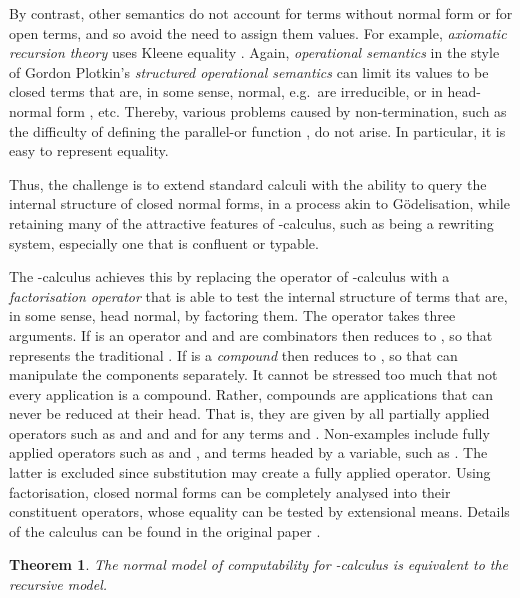 \documentclass[a4paper]{article}
\newtheorem{theorem}{Theorem}
\begin{document}
By contrast, other semantics do not account for terms without normal
form or for open terms, and so avoid the need to assign them values.
For example, {\em axiomatic recursion theory} \cite{Rogers67, Jones97}
uses Kleene equality \cite[page 327]{Kleene52}.  Again, {\em operational semantics} in the style
of Gordon Plotkin's {\em structured operational semantics}
\cite{Plotkin04} can limit its values to be closed terms that are, in
some sense, normal, e.g.\ are irreducible, or in head-normal form
\cite{Bare84a}, etc. Thereby, various problems caused by non-termination,
such as the difficulty of defining the parallel-or function
\cite{Abramsky00}, do not arise. In particular, it is easy to
represent equality.


Thus, the challenge is to extend standard calculi with the ability to
query the internal structure of closed normal forms, in a process akin
to G\"odelisation, while retaining many of the attractive features of
-calculus, such as being a rewriting system, especially one that
is confluent or typable.



The -calculus achieves this by replacing the operator  of
-calculus with a {\em factorisation operator}  that is able to
test the internal structure of terms that are, in some sense, head
normal, by factoring them.  The operator  takes three arguments. If
 is an operator and  and  are combinators then  reduces
to , so that  represents the traditional . If  is a {\em
  compound} then  reduces to , so that  can
manipulate the components separately. It cannot be stressed too much
that not every application is a compound.  Rather, compounds are
applications that can never be reduced at their head.  That is, they
are given by all partially applied operators such as  and 
and  and  for any terms  and .  Non-examples include
fully applied operators such as  and , and terms headed by
a variable, such as . The latter is excluded since substitution
may create a fully applied operator. Using factorisation, closed
normal forms can be completely analysed into their constituent
operators, whose equality can be tested by extensional means.  Details of the calculus
can be found in the original paper \cite{JGW11}.


\begin{theorem}
  The normal model of computability for -calculus is equivalent
  to the recursive model. 
\end{theorem}
\end{document}
